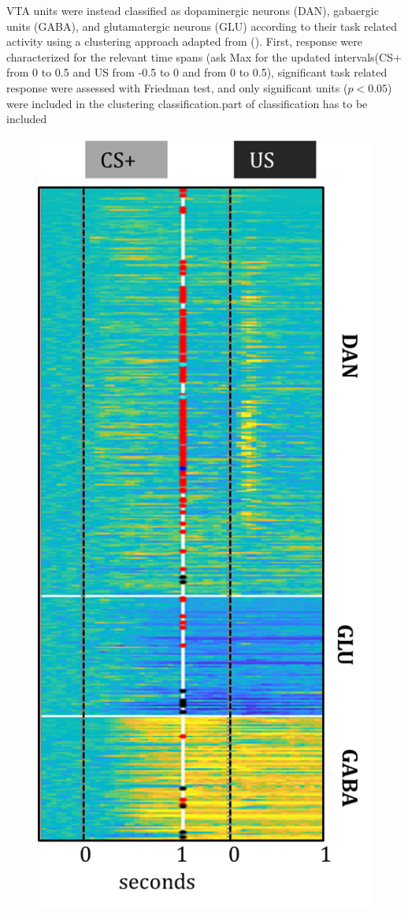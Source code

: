 VTA units were instead classified as dopaminergic neurons (DAN), gabaergic units (GABA), and glutamatergic neurons (GLU) according to their task related activity using a clustering approach adapted from (\cite{Uchida}). First, response were characterized for the relevant time spans ({\color{red}ask Max for the updated intervals}(CS+ from 0 to 0.5 and US from -0.5 to 0 and from 0 to 0.5), significant task related response were assessed with Friedman test, and only significant units ($p<0.05$) were included in the clustering classification.{\color{red}part of classification has to be included}
\begin{figure}
  \centering
    \includegraphics[scale=0.75]{figures/ClassificationUnits.png}

\end{figure}
